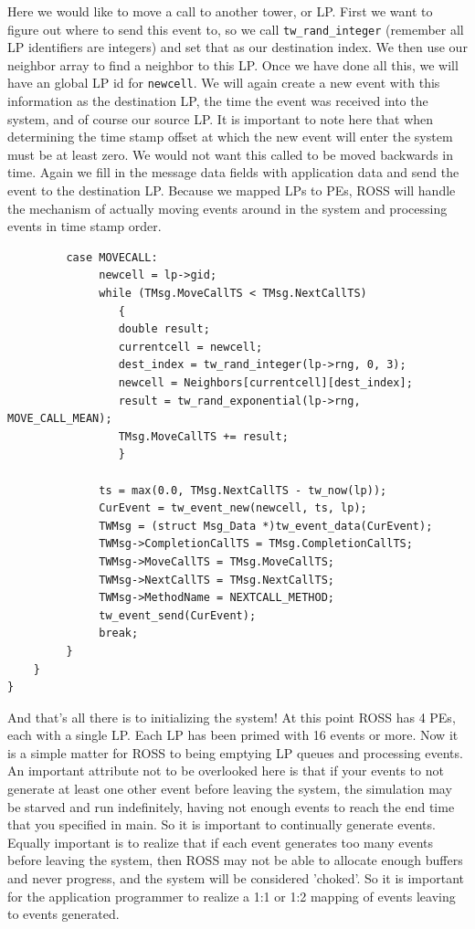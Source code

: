 \documentclass[12pt]{article}
\begin{document}
Here we would like to move a call to another tower, or LP.  First we want to
figure out where to send this event to, so we call {\tt tw\_rand\_integer}
(remember all LP identifiers are integers) and set that as our destination
index.  We then use our neighbor array to find a neighbor to this LP.  Once we
have done all this, we will have an global LP id for {\tt newcell}.  We will
again create a new event with this information as the destination LP, the time
the event was received into the system, and of course our source LP.  It is
important to note here that when determining the time stamp offset at which
the new event will enter the system must be at least zero.  We would not want
this called to be moved backwards in time.  Again we fill in the message data
fields with application data and send the event to the destination LP.
Because we mapped LPs to PEs, ROSS will handle the mechanism of actually
moving events around in the system and processing events in time stamp order.

\begin{verbatim} 
         case MOVECALL:
              newcell = lp->gid;
              while (TMsg.MoveCallTS < TMsg.NextCallTS)
                 {
                 double result;
                 currentcell = newcell;
                 dest_index = tw_rand_integer(lp->rng, 0, 3);
                 newcell = Neighbors[currentcell][dest_index];
                 result = tw_rand_exponential(lp->rng, MOVE_CALL_MEAN);
                 TMsg.MoveCallTS += result;
                 }

              ts = max(0.0, TMsg.NextCallTS - tw_now(lp));
              CurEvent = tw_event_new(newcell, ts, lp);
              TWMsg = (struct Msg_Data *)tw_event_data(CurEvent);
              TWMsg->CompletionCallTS = TMsg.CompletionCallTS;
              TWMsg->MoveCallTS = TMsg.MoveCallTS;
              TWMsg->NextCallTS = TMsg.NextCallTS;
              TWMsg->MethodName = NEXTCALL_METHOD;
              tw_event_send(CurEvent);
              break;
         }
    }
}
\end{verbatim} 

And that's all there is to initializing the system!  At this point ROSS has 4
PEs, each with a single LP.  Each LP has been primed with 16 events or more.
Now it is a simple matter for ROSS to being emptying LP queues and processing
events.  An important attribute not to be overlooked here is that if your
events to not generate at least one other event before leaving the system, the
simulation may be starved and run indefinitely, having not enough events to
reach the end time that you specified in main.  So it is important to
continually generate events.  Equally important is to realize that if each
event generates too many events before leaving the system, then ROSS may not
be able to allocate enough buffers and never progress, and the system will be
considered 'choked'.  So it is important for the application programmer to
realize a 1:1 or 1:2 mapping of events leaving to events generated.
\end{document}
